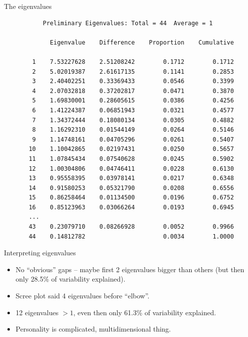 \documentclass[pdf]{prosper}
\begin{document}
\begin{slide}{The eigenvalues}

{\scriptsize
\begin{verbatim}
           Preliminary Eigenvalues: Total = 44  Average = 1
 
             Eigenvalue    Difference    Proportion    Cumulative

        1    7.53227628    2.51208242        0.1712        0.1712
        2    5.02019387    2.61617135        0.1141        0.2853
        3    2.40402251    0.33369433        0.0546        0.3399
        4    2.07032818    0.37202817        0.0471        0.3870
        5    1.69830001    0.28605615        0.0386        0.4256
        6    1.41224387    0.06851943        0.0321        0.4577
        7    1.34372444    0.18080134        0.0305        0.4882
        8    1.16292310    0.01544149        0.0264        0.5146
        9    1.14748161    0.04705296        0.0261        0.5407
       10    1.10042865    0.02197431        0.0250        0.5657
       11    1.07845434    0.07540628        0.0245        0.5902
       12    1.00304806    0.04746411        0.0228        0.6130
       13    0.95558395    0.03978141        0.0217        0.6348
       14    0.91580253    0.05321790        0.0208        0.6556
       15    0.86258464    0.01134500        0.0196        0.6752
       16    0.85123963    0.03066264        0.0193        0.6945
       ...
       43    0.23079710    0.08266928        0.0052        0.9966
       44    0.14812782                      0.0034        1.0000
\end{verbatim}
}

\end{slide}
\begin{slide}{Interpreting eigenvalues}

\begin{itemize}
\item 
No ``obvious'' gaps -- maybe first 2 eigenvalues bigger than others (but then only 28.5\% of variability explained).
\item Scree plot said 4 eigenvalues before ``elbow''.
\item 12 eigenvalues $>1$, even then only 61.3\% of variability explained.
\item Personality is complicated, multidimensional thing.
\end{itemize}
  
\end{slide}
\end{document}
